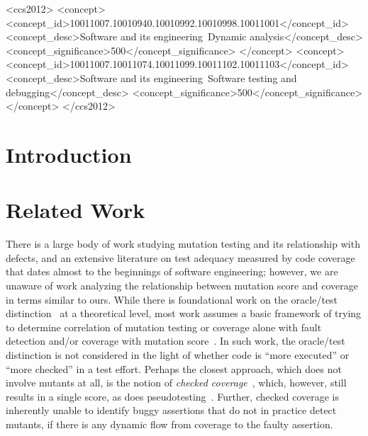 \documentclass[sigconf,review, anonymous]{acmart}
\begin{document}
\begin{CCSXML}
<ccs2012>
<concept>
<concept_id>10011007.10010940.10010992.10010998.10011001</concept_id>
<concept_desc>Software and its engineering~Dynamic analysis</concept_desc>
<concept_significance>500</concept_significance>
</concept>
<concept>
<concept_id>10011007.10011074.10011099.10011102.10011103</concept_id>
<concept_desc>Software and its engineering~Software testing and debugging</concept_desc>
<concept_significance>500</concept_significance>
</concept>
</ccs2012>
\end{CCSXML}


\maketitle

\section{Introduction}

\section{Related Work}

There is a large body of work studying mutation testing and its relationship 
with defects, and an extensive literature on test adequacy measured by
code coverage that dates almost to the beginnings of software
engineering; however, we are
unaware of work analyzing the relationship
between mutation score and coverage in terms similar to ours.   While
there is foundational work on the oracle/test
distinction~\cite{StaatsOracle} at a theoretical level, most work assumes a basic framework of  trying to determine
correlation of mutation testing or coverage alone with fault
detection and/or coverage with mutation score~\cite{papadakis2018mutation,PapadakisStudy,ThierryStudy}.  In
such work, the oracle/test distinction is not considered in the
light of whether code is ``more executed'' or ``more checked'' in a
test effort.  Perhaps the
closest approach, which does not involve mutants at all, is the notion
of \emph{checked coverage}~\cite{ZellerCheckedCov}, which, however, still results in a
single score, as does pseudotesting~\cite{pseudotestingorig,
  pseudotestingstudy, descartes}.  Further, checked coverage is
inherently unable to identify buggy assertions that do not in practice
detect mutants, if there is any dynamic flow
from coverage to the faulty assertion.
\end{document}
